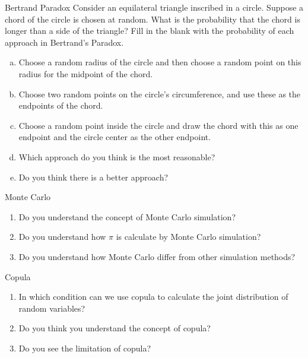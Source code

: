 \documentclass{article}
\begin{document}
\begin{problem}
    {Bertrand Paradox}{}
    Consider an equilateral triangle inscribed in a circle. Suppose a chord of the circle is chosen at random. What is the probability that the chord is longer than a side of the triangle?
    Fill in the blank with the probability of each approach in Bertrand's Paradox.
    \begin{enumerate}[(a)]
        \item Choose a random radius of the circle and then choose a random point on this radius for the midpoint of the chord. \myrule{}
        \item Choose two random points on the circle's circumference, and use these as the endpoints of the chord. \myrule{}
        \item Choose a random point inside the circle and draw the chord with this as one endpoint and the circle center as the other endpoint. \myrule{}
        \item Which approach do you think is the most reasonable? \myrule{}
        \item Do you think there is a better approach? \myrule{}
    \end{enumerate}
\end{problem}

\begin{problem}
    {Monte Carlo}{}
    \begin{enumerate}
        \item Do you understand the concept of Monte Carlo simulation? \myrule{}
        \item Do you understand how $\pi$ is calculate by Monte Carlo simulation? \myrule{}
        \item Do you understand how Monte Carlo differ from other simulation methods? \\ \myrule{}
    \end{enumerate}
\end{problem}

\begin{problem}
    {Copula}{}
    \begin{enumerate}
        \item In which condition can we use copula to calculate the joint distribution of random variables? \myrule{}
        \item Do you think you understand the concept of copula? \myrule{}
        \item Do you see the limitation of copula? \myrule{}
    \end{enumerate}
\end{problem}
\end{document}
